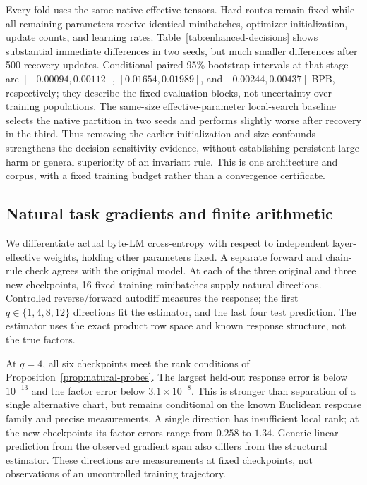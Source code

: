 

Every fold uses the same native effective tensors. Hard routes remain fixed
while all remaining parameters receive identical minibatches, optimizer
initialization, update counts, and learning rates. Table~\ref{tab:enhanced-decisions}
shows substantial immediate differences in two seeds, but much smaller
differences after 500 recovery updates. Conditional paired 95\% bootstrap
intervals at that stage are $[-0.00094,0.00112]$, $[0.01654,0.01989]$, and
$[0.00244,0.00437]$ BPB, respectively; they describe the fixed evaluation
blocks, not uncertainty over training populations. The same-size
effective-parameter local-search baseline selects the native partition in
two seeds and performs slightly worse after recovery in the third.
Thus removing the earlier initialization and size confounds strengthens the
decision-sensitivity evidence, without establishing persistent large harm or
general superiority of an invariant rule. This is one architecture and corpus,
with a fixed training budget rather than a convergence certificate.

\subsection{Natural task gradients and finite arithmetic}
\label{sec:natural-gradients}

We differentiate actual byte-LM cross-entropy with respect to independent
layer-effective weights, holding other parameters fixed. A separate forward
and chain-rule check agrees with the original model. At each of the three
original and three new checkpoints, 16 fixed training minibatches supply
natural directions. Controlled reverse/forward autodiff measures the response;
the first $q\in\{1,4,8,12\}$ directions fit the estimator, and the last four
test prediction. The estimator uses the exact product row space and known
response structure, not the true factors.



At $q=4$, all six checkpoints meet the rank conditions of
Proposition~\ref{prop:natural-probes}. The largest held-out response error is
below $10^{-13}$ and the factor error below $3.1\times10^{-8}$.
This is stronger than separation of a single alternative chart, but remains
conditional on the known Euclidean response family and precise measurements.
A single direction has insufficient local rank; at the new checkpoints its
factor errors range from $0.258$ to $1.34$. Generic linear prediction from the
observed gradient span also differs from the structural estimator. These
directions are measurements at fixed checkpoints, not observations of an
uncontrolled training trajectory.


